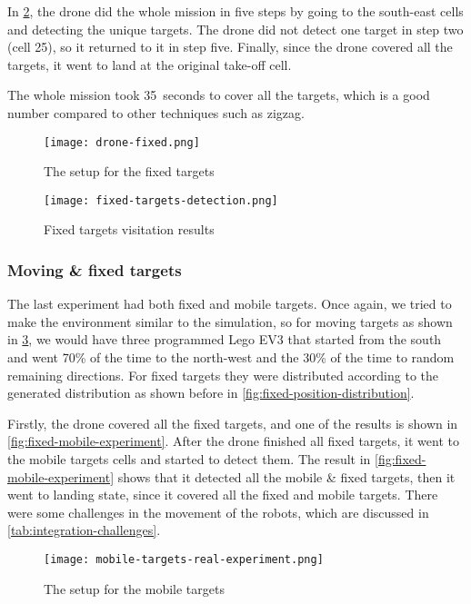 \documentclass[../main.tex]{subfiles}
\begin{document}
In \cref{fig:fixed-location-detection-camera},
the drone did the whole mission in five steps by going
to the south-east cells and detecting the unique targets. 
The drone did not detect one target in 
step two (cell 25), so it returned to it in step five. Finally,
since the drone covered all the targets, it 
went to land at the original take-off cell.

The whole mission took \SI{35}{seconds} to cover all the targets,
which is a good number compared to other techniques such as zigzag.

\begin{figure}[H]
	\centering
	\texttt{[image: drone-fixed.png]}
	\caption{The setup for the fixed targets}
	\label{fig:targets-location}
\end{figure}


\begin{figure}[H]
	\centering
	\texttt{[image: fixed-targets-detection.png]}
	\caption{Fixed targets visitation results}
	\label{fig:fixed-location-detection-camera}
\end{figure}

\subsubsection{Moving \& fixed targets}

The last experiment had both fixed and mobile targets.
Once again, we tried to make the environment similar to the 
simulation, so for moving targets as shown in 
\cref{fig:mobile-targets-real-experiment}, we would have 
three programmed Lego EV3 that started
from the south and went 70\% of the time to the north-west 
and the 30\% of the time to random remaining directions. For fixed
targets they were distributed according to the generated distribution
as shown before in \cref{fig:fixed-position-distribution}.

Firstly, the drone covered all the fixed targets, and one of the 
results is shown in \cref{fig:fixed-mobile-experiment}. After the 
drone finished all fixed targets, it went to the mobile targets cells and
started to detect them. The result in \cref{fig:fixed-mobile-experiment} 
shows that it detected all the mobile \& fixed targets, 
then it went to landing state, since it covered all the fixed and mobile targets.
There were some challenges in the movement of the robots, which are 
discussed in \cref{tab:integration-challenges}.

\begin{figure}[H]
	\centering
	\texttt{[image: mobile-targets-real-experiment.png]}
	\caption{The setup for the mobile targets}
	\label{fig:mobile-targets-real-experiment}
\end{figure}
\end{document}
